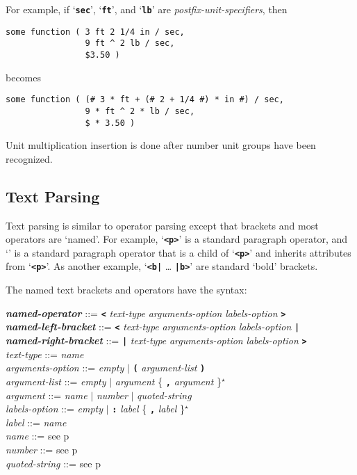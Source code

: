 \documentclass[12pt]{article}
\newcommand{\TT}[1]{{\tt \bfseries #1}}
\newcommand{\emkey}[1]{{\em \bfseries #1}}
\newcommand{\pagref}[1]{p\pageref{#1}}
\newcommand{\STAR}{{\Large $^\star$}}
\newenvironment{indpar}[1][0.3in]%
	{\begin{list}{}%
		     {\setlength{\itemsep}{0in}%
		      \setlength{\topsep}{0in}%
		      \setlength{\parsep}{1ex}%
		      \setlength{\labelwidth}{#1}%
		      \setlength{\leftmargin}{#1}%
		      \addtolength{\leftmargin}{\labelsep}}%
	 \item}%
	{\end{list}}
\begin{document}
For example, if `\TT{sec}', `\TT{ft}', and `\TT{lb}'
are {\em postfix-unit-specifiers},
then
\begin{indpar}\begin{verbatim}
some function ( 3 ft 2 1/4 in / sec,
                9 ft ^ 2 lb / sec,
                $3.50 )
\end{verbatim}\end{indpar}
becomes
\begin{indpar}\begin{verbatim}
some function ( (# 3 * ft + (# 2 + 1/4 #) * in #) / sec,
                9 * ft ^ 2 * lb / sec,
                $ * 3.50 )
\end{verbatim}\end{indpar}

Unit multiplication insertion is done after number unit groups have been
recognized.

\subsection{Text Parsing}
\label{TEXT-PARSING}

Text parsing is similar to operator parsing except that brackets and
most operators are `named'.
For example, `\TT{<p>}' is a standard paragraph operator,
and `\TT{<indented p>}' is a standard paragraph operator
that is a child of `\TT{<p>}'
and inherits attributes from `\TT{<p>}'.  As another example,
`\TT{<b|} \ldots{} \TT{|b>}' are standard `bold' brackets.

The named text brackets and operators
have the syntax:

\begin{indpar}
\emkey{named-operator} ::=
    \TT{<} {\em text-type} {\em arguments-option} {\em labels-option} \TT{>}
    \\[1ex]
\emkey{named-left-bracket} ::=
    \TT{<} {\em text-type} {\em arguments-option} {\em labels-option} \TT{|}
    \\[1ex]
\emkey{named-right-bracket} ::=
    \TT{|} {\em text-type} {\em arguments-option} {\em labels-option} \TT{>}
    \\[1ex]
{\em text-type} ::= {\em name}
    \\[1ex]
{\em arguments-option} ::= {\em empty} $|$ \TT{(} {\em argument-list} \TT{)}
    \\[1ex]
{\em argument-list} ::= {\em empty}
                    $|$ {\em argument} \{ \TT{,} {\em argument} \}\STAR{}
    \\[1ex]
{\em argument} ::= {\em name} $|$ {\em number} $|$ {\em quoted-string}
    \\[1ex]
{\em labels-option} ::= {\em empty} $|$ \TT{:} {\em label}
				\{ \TT{,} {\em label} \}\STAR{}
    \\[1ex]
{\em label} ::= {\em name}
    \\[1ex]
{\em name} ::= see \pagref{NAME}
    \\[1ex]
{\em number} ::= see \pagref{NUMBER}
    \\[1ex]
{\em quoted-string} ::= see \pagref{QUOTED-STRINGS}
\end{indpar}
\end{document}

